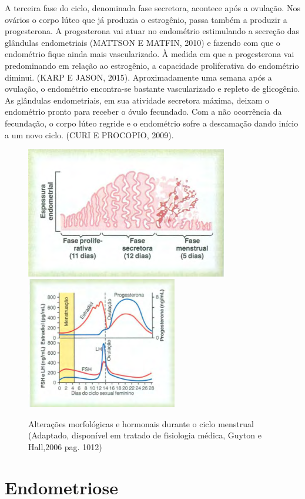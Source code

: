 \documentclass[12pt]{article} %
\begin{document}
A terceira fase do ciclo, denominada fase secretora, acontece após a
ovulação. Nos ovários o corpo lúteo que já produzia o estrogênio,
passa também a produzir a progesterona.  A progesterona vai atuar no
endométrio estimulando a secreção das glândulas endometriais (MATTSON E MATFIN, 2010) e fazendo com que o endométrio fique ainda mais
vascularizado. À medida em que a progesterona vai predominando em
relação ao estrogênio, a capacidade proliferativa do endométrio
diminui. (KARP E JASON, 2015).  Aproximadamente uma semana após a
ovulação, o endométrio encontra-se bastante vascularizado e repleto de
glicogênio. As glândulas endometriais, em sua atividade secretora
máxima, deixam o endométrio pronto para receber o óvulo fecundado. Com
a não ocorrência da fecundação, o corpo lúteo regride e o endométrio
sofre a descamação dando início a um novo ciclo.  (CURI E PROCOPIO,
2009).


\begin{figure}[h!]
\centering
\includegraphics[width=8.8cm]{ciclo.png}
\includegraphics[width=6.6cm]{cilco2.png}
\caption[Alterações morfológicas e hormonais durante o ciclo menstrual]{ Alterações morfológicas e hormonais durante o ciclo menstrual (Adaptado, disponível em tratado de fisiologia médica, Guyton e Hall,2006 pag. 1012)} 
\label{ciclo menstrual}
\end{figure} 

\section{Endometriose}
\end{document}

